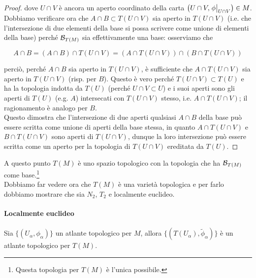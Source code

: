 \begin{proof}
	dove $ U \cap V $ è ancora un aperto coordinato della carta $ \left( U \cap V,\eval{\phi}_{U \cap V} \right) \in M $. Dobbiamo verificare ora che $ A \cap B \subset T(U \cap V) $ sia aperto in $ T(U \cap V) $ (i.e. che l'intersezione di due elementi della base si possa scrivere come unione di elementi della base) perché $ \mathcal{B}_{T(M)} $ sia effettivamente una base: osserviamo che
	
	\begin{equation}
		A \cap B = (A \cap B) \cap T(U \cap V) %
		= (A \cap T(U \cap V)) \cap (B \cap T(U \cap V))
	\end{equation}

	perciò, perché $ A \cap B $ sia aperto in $ T(U \cap V) $, è sufficiente che $ A \cap T(U \cap V) $ sia aperto in $ T(U \cap V) $ (risp. per $ B $). Questo è vero perché $ T(U \cap V) \subset T(U) $ e ha la topologia indotta da $ T(U) $ (perché $ U \cap V \subset U $) e i suoi aperti sono gli aperti di $ T(U) $ (e.g. $ A $) intersecati con $ T(U \cap V) $ stesso, i.e. $ A \cap T(U \cap V) $; il ragionamento è analogo per $ B $.\\
	Questo dimostra che l'intersezione di due aperti qualsiasi $ A \cap B $ della base può essere scritta come unione di aperti della base stessa, in quanto $ A \cap T(U \cap V) $ e $ B \cap T(U \cap V) $ sono aperti di $ T(U \cap V) $, dunque la loro intersezione può essere scritta come un aperto per la topologia di $ T(U \cap V) $ ereditata da $ T(U) $.
\end{proof}

A questo punto $ T(M) $ è uno spazio topologico con la topologia che ha $ \mathcal{B}_{T(M)} $ come base.\footnote{%
	Questa topologia per $ T(M) $ è l'unica possibile.%
}\\
Dobbiamo far vedere ora che $ T(M) $ è una varietà topologica e per farlo dobbiamo mostrare che sia $ N_{2} $, $ T_{2} $ e localmente euclideo.

\paragraph{Localmente euclideo}

\begin{definition}
	Sia $ \{(U_{\alpha},\phi_{\alpha})\} $ un atlante topologico per $ M $, allora $ \{(T(U_{\alpha}),\tilde{\phi}_{\alpha})\} $ è un atlante topologico per $ T(M) $.
\end{definition}

